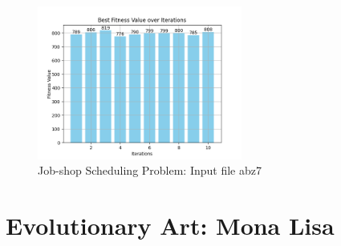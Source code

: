 \documentclass[12pt]{article}
\begin{document}
\begin{figure}[h]
    \centering
    \includegraphics[width=0.6\textwidth]{images/abz7_rntr1000-200-500-0.45-10.png}
    \caption{Job-shop Scheduling Problem: Input file abz7}
\end{figure}

\section{Evolutionary Art: Mona Lisa}
\end{document}
